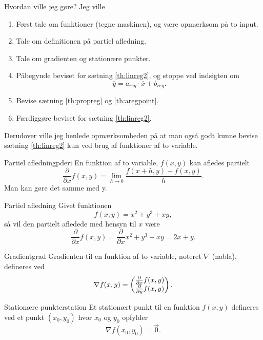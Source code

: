 \documentclass{article}
\begin{document}
\begin{eksempel*}{Hvordan ville jeg gøre?}
	Jeg ville
	\begin{enumerate}
		\item Først tale om funktioner (tegne maskinen), og være opmærksom på
			to input.
		\item Tale om definitionen på partiel afledning.
		\item Tale om gradienten og stationære punkter.
		\item Påbegynde beviset for sætning \ref{th:linreg2}, og stoppe ved
			indsigten om
			\[
				\overline{y} = a_{reg} \cdot \overline{x} + b_{reg}.
			\] 
		\item Bevise sætning \ref{th:propreg} og \ref{th:aregpoint}.
		\item Færdiggøre beviset for sætning \ref{th:linreg2}.
	\end{enumerate}
	Derudover ville jeg henlede opmærksomheden på at man også godt kunne bevise
	sætning \ref{th:linreg2} kun ved brug af funktioner af to variable.
\end{eksempel*}

\begin{definition}{Partiel afledning}{pderi}
	En funktion af to variable, $f(x, y)$ kan afledes partielt
	\[
		\frac{\partial}{\partial x} f(x, y) = \lim_{h\rightarrow0} \frac{f(x+h, y) - f(x, y)}{h}.
	\] 
	Man kan gøre det samme med y.
\end{definition}

\begin{eksempel*}{Partiel afledning}{}
	Givet funktionen
	\[
		f(x, y) = x^2 + y^3 + xy,
	\] 
	så vil den partielt afledede med hensyn til $x$ være
	\[
		\frac{\partial}{\partial x}f(x, y) = \frac{\partial}{\partial x} x^2 + y^3 + xy = 2x + y.
	\] 
\end{eksempel*}

\begin{definition}{Gradient}{grad}
	Gradienten til en funktion af to variable, noteret $\nabla$ (nabla), defineres ved
	\[
		\nabla f(x, y) =  \begin{pmatrix} \frac{\partial}{\partial x}f(x, y)\\ \frac{\partial}{\partial y}f(x, y) \end{pmatrix} .
	\] 
\end{definition}

\begin{definition}{Stationære punkter}{station}
	Et stationært punkt til en funktion $f(x, y)$ defineres ved et punkt 
	$(x_0, y_0)$ hvor $x_0$ og $y_0$ opfylder
	\[
		\nabla f(x_0, y_0) = \vec{0}.
	\] 
\end{definition}
\end{document}
